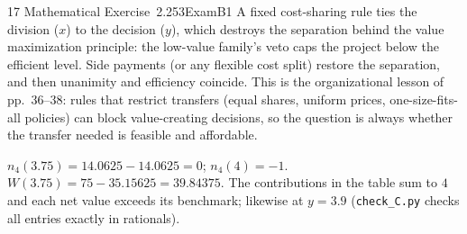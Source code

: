 \begin{exsol}{17}{\MR{} Mathematical Exercise~2.2}{53}{Exam}{B1}
\interp A fixed cost-sharing rule ties the division ($x$) to the decision ($y$), which destroys
the separation behind the value maximization principle: the low-value family's veto caps the
project below the efficient level. Side payments (or any flexible cost split) restore the
separation, and then unanimity and efficiency coincide. This is the organizational lesson of
\MR{} pp.~36--38: rules that restrict transfers (equal shares, uniform prices, one-size-fits-all
policies) can block value-creating decisions, so the question is always whether the transfer
needed is feasible and affordable.

\verify $n_4(3.75) = 14.0625 - 14.0625 = 0$; $n_4(4) = -1$. $W(3.75) = 75 - 35.15625 = 39.84375$.
The contributions in the table sum to $4$ and each net value exceeds its benchmark; likewise at
$y = 3.9$ (\texttt{check\_C.py} checks all entries exactly in rationals).

\end{exsol}
